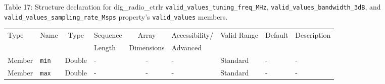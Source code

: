 \documentclass{article}
\def\comp{dig\_radio\_ctrlr}
\begin{document}
\begin{landscape}
	\noindent Table \hypertarget{tab17}{17}: Structure declaration for \comp{} \verb+valid_values_tuning_freq_MHz+, \verb+valid_values_bandwidth_3dB+, and \\ \verb+valid_values_sampling_rate_Msps+ property's \verb+valid_values+ members.
	\begin{scriptsize}
		\noindent\begin{longtable}{|p{1.8cm}|p{3.6cm}|c|p{4cm}|c|p{2cm}|p{1.7cm}|p{0.8cm}|p{4.69cm}|}
			\hline
			\rowcolor{blue}
			Type         & Name                                & Type & Sequence & Array      & Accessibility/ & Valid Range  & Default & Description                                                                                                                                                                                                                       \\
			\rowcolor{blue}
			             &                                     &      & Length   & Dimensions & Advanced       &              &         &                                                                                                                                                                                                                             \\
			\hline
			Member       & \verb+min+                          & Double & -       & -          & -              & Standard     & -       & - \\
			\hline
			Member       & \verb+max+                          & Double & -       & -          & -              & Standard     & -       & - \\
			\hline
		\end{longtable}
	\end{scriptsize}

\end{landscape}


 


\begin{thebibliography}{1}

   \\

\end{thebibliography}
\end{document}

